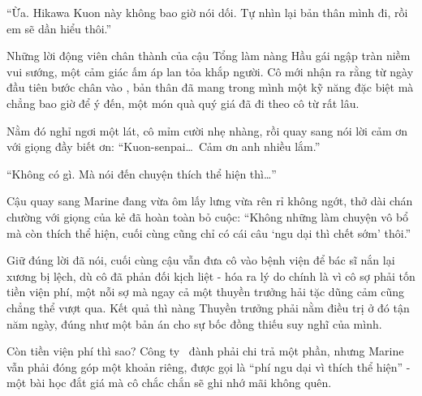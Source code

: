 \documentclass[../main.tex]{subfiles}
\begin{document}
``Ừa. Hikawa Kuon này không bao giờ nói dối. Tự nhìn lại bản thân mình đi, rồi em sẽ dần hiểu thôi.''

Những lời động viên chân thành của cậu Tổng làm nàng Hầu gái ngập tràn niềm vui sướng, một cảm giác ấm áp lan tỏa khắp người. Cô mới nhận ra rằng từ ngày đầu tiên bước chân vào \hll, bản thân đã mang trong mình một kỹ năng đặc biệt mà chẳng bao giờ để ý đến, một món quà quý giá đã đi theo cô từ rất lâu.

Nằm đó nghỉ ngơi một lát, cô mỉm cười nhẹ nhàng, rồi quay sang nói lời cảm ơn với giọng đầy biết ơn: ``Kuon-senpai\dots\ Cảm ơn anh nhiều lắm.''

``Không có gì. Mà nói đến chuyện thích thể hiện thì\dots''

Cậu quay sang Marine đang vừa ôm lấy lưng vừa rên rỉ không ngớt, thở dài chán chường với giọng của kẻ đã hoàn toàn bỏ cuộc: ``Không những làm chuyện vô bổ mà còn thích thể hiện, cuối cùng cũng chỉ có cái câu `ngu dại thì chết sớm' thôi.''

Giữ đúng lời đã nói, cuối cùng cậu vẫn đưa cô vào bệnh viện để bác sĩ nắn lại xương bị lệch, dù cô đã phản đối kịch liệt - hóa ra lý do chính là vì cô sợ phải tốn tiền viện phí, một nỗi sợ mà ngay cả một thuyền trưởng hải tặc dũng cảm cũng chẳng thể vượt qua. Kết quả thì nàng Thuyền trưởng phải nằm điều trị ở đó tận năm ngày, đúng như một bản án cho sự bốc đồng thiếu suy nghĩ của mình.

Còn tiền viện phí thì sao? Công ty \hll\ đành phải chi trả một phần, nhưng Marine vẫn phải đóng góp một khoản riêng, được gọi là ``phí ngu dại vì thích thể hiện'' - một bài học đắt giá mà cô chắc chắn sẽ ghi nhớ mãi không quên.
\end{document}
